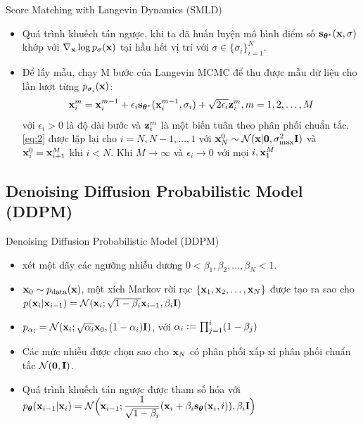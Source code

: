 \documentclass[10pt]{beamer}
\theoremstyle{remark}
\numberwithin{algocf}{section}
\numberwithin{equation}{section}
\numberwithin{dl}{section}
\numberwithin{figure}{section}
\begin{document}
\begin{frame}{Score Matching with Langevin Dynamics (SMLD)}
	\begin{itemize}
		\item Quá trình khuếch tán ngược, khi ta đã huấn luyện mô hình điểm số $\bold{s}_{\boldsymbol{\theta}^{\ast}}(\bold{x}, \sigma)$ khớp với $\nabla_{\bold{x}} \log p_{\sigma}(\bold{x})$ tại hầu hết vị trí với $\sigma \in \lbrace \sigma_i \rbrace_{i=1}^N$.
		\item Để lấy mẫu, \citep{song2019generative} chạy M bước của Langevin MCMC để thu được mẫu dữ liệu cho lần lượt từng $p_{\sigma_i}(\bold{x})$:
		\begin{equation} \label{eq:2}
			\bold{x}_i^m = \bold{x}_i^{m-1} + \epsilon_i \bold{s}_{\boldsymbol{\theta}^{\ast}} (\bold{x}_i^{m-1}, \sigma_i) + \sqrt{2 \epsilon_i} \bold{z}_i^m, m = 1, 2, \dots, M
		\end{equation}
		với $\epsilon_i > 0$ là độ dài bước và $\bold{z}_i^m$ là một biến tuân theo phân phối chuẩn tắc.
		\ref{eq:2} được lặp lại cho $i=N, N-1, \dots, 1$ với $\bold{x}_N^0 \sim \mathcal{N}(\bold{x} \vert \bold{0}, \sigma_{\max}^2 \bold{I})$ và $\bold{x}_i^0 = \bold{x}_{i+1}^M$ khi $i < N$. Khi $M \rightarrow \infty$ và $\epsilon_i \rightarrow 0$ với mọi $i, \bold{x}_1^M$
	\end{itemize}
\end{frame}

\subsection{Denoising Diffusion Probabilistic Model (DDPM)}

\begin{frame}{Denoising Diffusion Probabilistic Model (DDPM)}
	\begin{itemize}
		\item \citep{sohl2015deep,ho2020denoising} xét một dãy các ngưỡng nhiễu dương $0 < \beta_1, \beta_2, \dots, \beta_N < 1$.
		\item $\bold{x}_0 \sim p_{\mathrm{data}}(\bold{x})$, một xích Markov rời rạc $\lbrace \bold{x}_1, \bold{x}_2, \dots, \bold{x}_N \rbrace$ được tạo ra sao cho $p(\bold{x}_i \vert \bold{x}_{i-1}) = \mathcal{N}(\bold{x}_i; \sqrt{1-\beta_i} \bold{x}_{i-1}, \beta_i \bold{I})$
		\item $p_{\alpha_i}=\mathcal{N}(\bold{x}_i; \sqrt{\alpha_i}\bold{x}_0, (1-\alpha_i)\bold{I})$,
		với $\alpha_i \vcentcolon = \prod_{j=1}^i (1 - \beta_j)$
		\item Các mức nhiễu được chọn sao cho $\bold{x}_N$ có phân phối xấp xỉ phân phối chuẩn tắc $\mathcal{N}(\bold{0}, \bold{I})$.
		\item Quá trình khuếch tán ngược được tham số hóa với $p_{\boldsymbol{\theta}} (\bold{x}_{i-1} \vert \bold{x}_i)=\mathcal{N}\Big(\bold{x}_{i-1}; \dfrac{1}{\sqrt{1-\beta_i}}(\bold{x}_i + \beta_i \bold{s}_{\boldsymbol{\theta}}(\bold{x}_i, i)), \beta_i \bold{I}\Big)$
		
	\end{itemize}
\end{frame}
\end{document}
